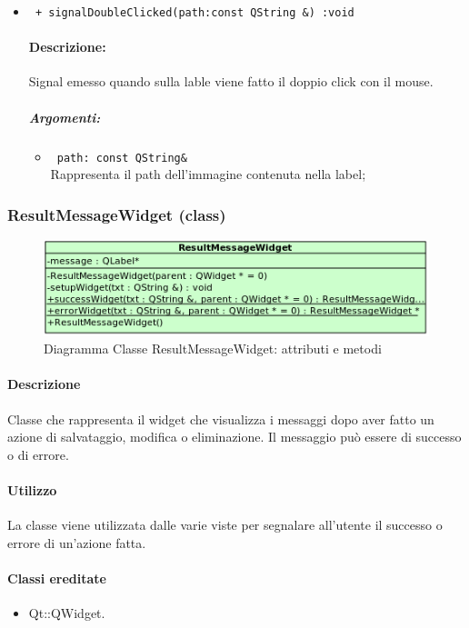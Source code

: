 \begin{itemize}
\item \color{blue}\verb! + signalDoubleClicked(path:const QString &) :void!
\color{black}
\paragraph{Descrizione:} Signal\g{} emesso quando sulla lable viene fatto il doppio click con il mouse.
\subparagraph{Argomenti:}
\begin{itemize}
\item \color{RoyalPurple} \verb! path: const QString& ! \\ Rappresenta il path dell'immagine contenuta nella label;
\end{itemize}

\end{itemize}
\color{black}
\pagebreak
\subsubsection{ResultMessageWidget (class)}
\label{speResult}
\begin{figure}[!h]
\centering
			\includegraphics[width=0.7\linewidth]{./Content/Immagini/view/ResultMessageWidget.png}
			\caption{Diagramma Classe ResultMessageWidget: attributi e metodi}
			\label{cl_resMess}
\end{figure}
\paragraph{Descrizione \\}
Classe che rappresenta il widget che visualizza i messaggi dopo aver fatto un azione di salvataggio, modifica o eliminazione.
Il messaggio può essere di successo o di errore.
\paragraph{Utilizzo\\}
La classe viene utilizzata dalle varie viste per segnalare all'utente il successo o errore di un'azione fatta.
\paragraph{Classi ereditate\\}
\begin{itemize}
\item Qt::QWidget.
\end{itemize}
